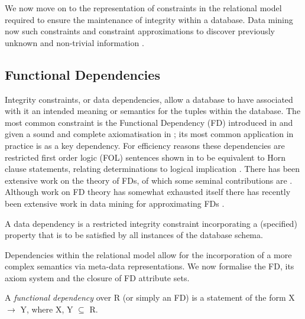 We now move on to the representation of constraints in the relational
model required to ensure the maintenance of integrity within a
database. Data mining now such constraints and constraint
approximations to discover previously unknown and non-trivial
information \cite{kdd96}.


\subsection{Functional Dependencies}
		
Integrity constraints, or data dependencies, allow a database to have
associated with it an intended meaning or semantics for the tuples
within the database.  The most common
constraint is the Functional Dependency (FD) introduced in
\cite{cod72} and given a sound and
complete axiomatisation in \cite{Arms74}; its most common application in practice is as
a key dependency. For efficiency reasons these dependencies
are restricted first order logic (FOL) sentences shown in
\cite{sdpf81} to be equivalent to Horn clause statements, relating
determinations to logical implication \cite{fag77,logicfound,mak87}.    There has been extensive work on the theory of FDs,
of which some seminal contributions are
\cite{Arms74,fag77,bb79,sdpf81}. Although work on FD theory has somewhat
exhausted itself there has recently been extensive work in data mining for
approximating FDs \cite{Mann92,sf93,bb95,hkp98}.

\begin{definition}
\begin{rm}
A data dependency is a restricted integrity constraint incorporating a
(specified) property that is to be satisfied by all instances of the database
schema.
\end{rm}
\end{definition}

Dependencies within the relational model allow for the incorporation of a more
complex semantics via meta-data representations. We now formalise the
FD, its axiom system and the closure of FD attribute sets.


\begin{definition}
\begin{rm}
A {\em functional dependency} over R (or simply an FD)
is a statement of the form X $\to$ Y, where X, Y $\subseteq$ R.
\end{rm}
\end{definition}
\medskip
 
